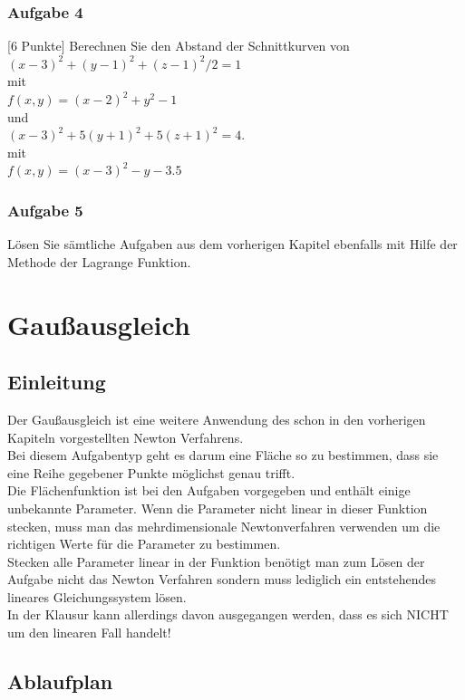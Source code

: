 \documentclass[11pt,final]{scrreprt}
\newcommand{\gbr} {\bigskip\\}
\begin{document}
\subsection{Aufgabe 4}
[6 Punkte] Berechnen Sie den Abstand der Schnittkurven von\\
$(x-3)^2+(y-1)^2+(z-1)^2/2=1$\\ mit\\
$f(x, y)=(x-2)^2+y^2-1$\gbr
und\gbr
$(x-3)^2+5(y+1)^2+5(z+1)^2=4$.\\ mit\\
$f(x,y)=(x-3)^2-y-3.5$\\

\subsection{Aufgabe 5}

Lösen Sie sämtliche Aufgaben aus dem vorherigen Kapitel ebenfalls mit Hilfe der Methode der Lagrange Funktion.\\


\chapter{Gaußausgleich}

\section{Einleitung}

Der Gaußausgleich ist eine weitere Anwendung des schon in den vorherigen Kapiteln vorgestellten Newton Verfahrens. \\
Bei diesem Aufgabentyp geht es darum eine Fläche so zu bestimmen, dass sie eine Reihe gegebener Punkte möglichst genau trifft.\\
Die Flächenfunktion ist bei den Aufgaben vorgegeben und enthält einige unbekannte Parameter. Wenn die Parameter nicht linear in dieser Funktion stecken, muss man das mehrdimensionale Newtonverfahren verwenden um die richtigen Werte für die Parameter zu bestimmen.\\
Stecken alle Parameter linear in der Funktion benötigt man zum Lösen der Aufgabe nicht das Newton Verfahren sondern muss lediglich ein entstehendes lineares Gleichungssystem lösen.\\
In der Klausur kann allerdings davon ausgegangen werden, dass es sich NICHT um den linearen Fall handelt!

\section{Ablaufplan}
\end{document}
